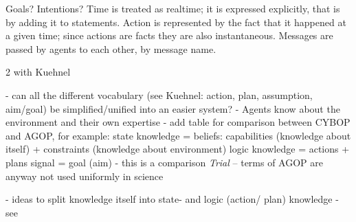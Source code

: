 Goals?
Intentions?
Time is treated as realtime; it is expressed explicitly, that is by adding it
to statements.
Action is represented by the fact that it happened at a given time;
since actions are facts they are also instantaneous.
Messages are passed by agents to each other, by message name.

2 with Kuehnel

- can all the different vocabulary (see Kuehnel: action, plan, assumption, aim/goal)
be simplified/unified into an easier system?
- Agents know about the environment and their own expertise
- add table for comparison between CYBOP and AGOP, for example:
    state knowledge = beliefs: capabilities (knowledge about itself)
        + constraints (knowledge about environment)
    logic knowledge = actions + plans
    signal = goal (aim)
- this is a comparison \emph{Trial} -- terms of AGOP are anyway not used uniformly in science

- ideas to split knowledge itself into state- and logic (action/ plan) knowledge
- see \cite[p. 95 ff., p. 125 ff.]{kuehnel}
